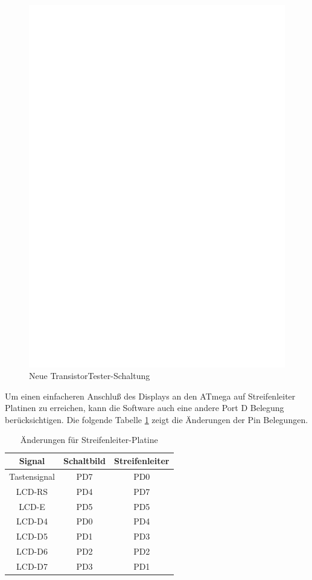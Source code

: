 \begin{figure}[H]
\centering
\includegraphics[width=18cm]{../FIG/ttester.eps}
\caption{Neue TransistorTester-Schaltung}
\label{fig:ttester}
\end{figure}

Um einen einfacheren Anschluß des Displays an den ATmega auf Streifenleiter Platinen zu erreichen,
kann die Software auch eine andere Port D Belegung ber\"ucksichtigen.
Die folgende Tabelle \ref{tab:grid-change} zeigt die \"Anderungen der Pin Belegungen.

\begin{table}[H]
  \begin{center}
    \begin{tabular}{| c | c | c |}
    \hline
       Signal & Schaltbild & Streifenleiter\\
    \hline
    Tastensignal  &  PD7   &  PD0 \\
    LCD-RS    &  PD4      & PD7 \\
    LCD-E     &  PD5   & PD5 \\
    LCD-D4    &  PD0   & PD4 \\
    LCD-D5    &  PD1   & PD3 \\
    LCD-D6    &  PD2   & PD2 \\
    LCD-D7    &  PD3   & PD1 \\
    \hline
    \end{tabular}
  \end{center}
  \caption{\"Anderungen f\"ur Streifenleiter-Platine}
  \label{tab:grid-change}
\end{table}


